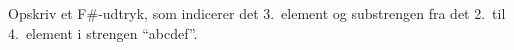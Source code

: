 Opskriv et F\#-udtryk, som indicerer det 3.\ element og substrengen fra det 2.\ til 4.\ element i strengen ``abcdef''.
